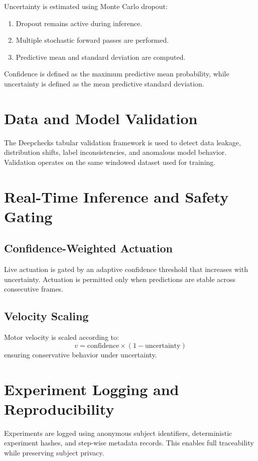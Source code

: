 \documentclass[11pt]{article}
\begin{document}
Uncertainty is estimated using Monte Carlo dropout:
\begin{enumerate}
    \item Dropout remains active during inference.
    \item Multiple stochastic forward passes are performed.
    \item Predictive mean and standard deviation are computed.
\end{enumerate}

Confidence is defined as the maximum predictive mean probability, while uncertainty is defined as the mean predictive standard deviation.

\section{Data and Model Validation}

The Deepchecks tabular validation framework is used to detect data leakage, distribution shifts, label inconsistencies, and anomalous model behavior. Validation operates on the same windowed dataset used for training.

\section{Real-Time Inference and Safety Gating}

\subsection{Confidence-Weighted Actuation}

Live actuation is gated by an adaptive confidence threshold that increases with uncertainty. Actuation is permitted only when predictions are stable across consecutive frames.

\subsection{Velocity Scaling}

Motor velocity is scaled according to:
\[
v = \text{confidence} \times (1 - \text{uncertainty})
\]
ensuring conservative behavior under uncertainty.

\section{Experiment Logging and Reproducibility}

Experiments are logged using anonymous subject identifiers, deterministic experiment hashes, and step-wise metadata records. This enables full traceability while preserving subject privacy.
\end{document}
